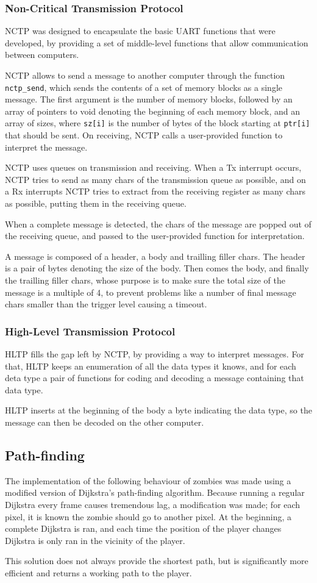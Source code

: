 \documentclass{article}
\theoremstyle{remark}
\begin{document}
\subsubsection{Non-Critical Transmission Protocol}
NCTP was designed to encapsulate the basic UART functions that were developed, by providing a set of middle-level functions that allow communication between computers.\par
NCTP allows to send a message to another computer through the function \texttt{nctp\_send}, which sends the contents of a set of memory blocks as a single message. The first argument is the number of memory blocks, followed by an array of pointers to void denoting the beginning of each memory block, and an array of sizes, where \texttt{sz[i]} is the number of bytes of the block starting at \texttt{ptr[i]} that should be sent. On receiving, NCTP calls a user-provided function to interpret the message.\par
NCTP uses queues on transmission and receiving. When a Tx interrupt occurs, NCTP tries to send as many chars of the transmission queue as possible, and on a Rx interrupts NCTP tries to extract from the receiving register as many chars as possible, putting them in the receiving queue.\par
When a complete message is detected, the chars of the message are popped out of the receiving queue, and passed to the user-provided function for interpretation.\par
A message is composed of a header, a body and trailling filler chars. The header is a pair of bytes denoting the size of the body. Then comes the body, and finally the trailling filler chars, whose purpose is to make sure the total size of the message is a multiple of 4, to prevent problems like a number of final message chars smaller than the trigger level causing a timeout.
\subsubsection{High-Level Transmission Protocol}
HLTP fills the gap left by NCTP, by providing a way to interpret messages. For that, HLTP keeps an enumeration of all the data types it knows, and for each deta type a pair of functions for coding and decoding a message containing that data type.\par
HLTP inserts at the beginning of the body a byte indicating the data type, so the message can then be decoded on the other computer.
\subsection{Path-finding}
The implementation of the following behaviour of zombies was made using a modified version of Dijkstra's path-finding algorithm. Because running a regular Dijkstra every frame causes tremendous lag, a modification was made; for each pixel, it is known the zombie should go to another pixel. At the beginning, a complete Dijkstra is ran, and each time the position of the player changes Dijkstra is only ran in the vicinity of the player.\par
This solution does not always provide the shortest path, but is significantly more efficient and returns a working path to the player.
\end{document}

